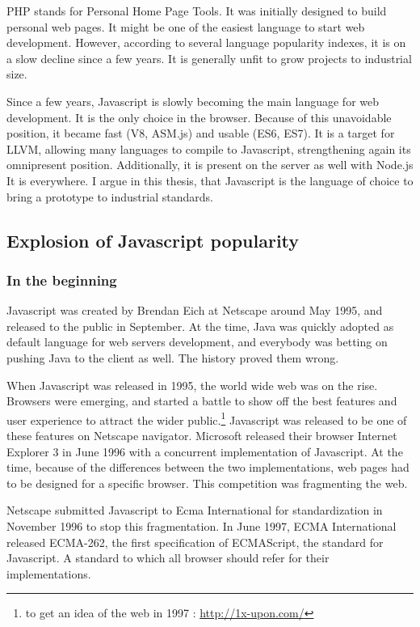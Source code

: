 PHP stands for Personal Home Page Tools.
It was initially designed to build personal web pages.
It might be one of the easiest language to start web development.
However, according to several language popularity indexes, it is on a slow decline since a few years.
It is generally unfit to grow projects to industrial size.

Since a few years, Javascript is slowly becoming the main language for web development.
It is the only choice in the browser.
Because of this unavoidable position, it became fast (V8, ASM.js) and usable (ES6, ES7).
It is a target for LLVM, allowing many languages to compile to Javascript, strengthening again its omnipresent position.
Additionally, it is present on the server as well with Node.js
It is everywhere.
I argue in this thesis, that Javascript is the language of choice to bring a prototype to industrial standards.

\subsection{Explosion of Javascript popularity}

\subsubsection{In the beginning}

Javascript was created by Brendan Eich at Netscape around May 1995, and released to the public in September.
At the time, Java was quickly adopted as default language for web servers development, and everybody was betting on pushing Java to the client as well.
The history proved them wrong.

When Javascript was released in 1995, the world wide web was on the rise.
Browsers were emerging, and started a battle to show off the best features and user experience to attract the wider public.\footnote{to get an idea of the web in 1997 : \url{http://1x-upon.com/}}
Javascript was released to be one of these features on Netscape navigator.
Microsoft released their browser Internet Explorer 3 in June 1996 with a concurrent implementation of Javascript.
At the time, because of the differences between the two implementations, web pages had to be designed for a specific browser.
This competition was fragmenting the web.

Netscape submitted Javascript to Ecma International for standardization in November 1996 to stop this fragmentation.
In June 1997, ECMA International released ECMA-262, the first specification of ECMAScript, the standard for Javascript.
A standard to which all browser should refer for their implementations.


